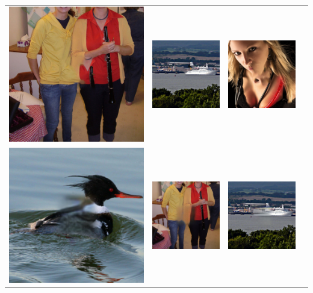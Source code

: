 \begin{longtable}{cccc}
  \includegraphics[width=.24\textwidth]{figures/imagenet/imagenet_0034_pm.jpg}&
  \includegraphics[width=.24\textwidth]{figures/imagenet/imagenet_0165_pm.jpg}&
  \includegraphics[width=.24\textwidth]{figures/imagenet/imagenet_0197_pm.png}\\
  \includegraphics[width=.24\textwidth]{figures/imagenet/0011_ce2.jpg}&
  \includegraphics[width=.24\textwidth]{figures/imagenet/0034_ce2.jpg}&
  \includegraphics[width=.24\textwidth]{figures/imagenet/0165_ce2.jpg}&

\end{longtable}
